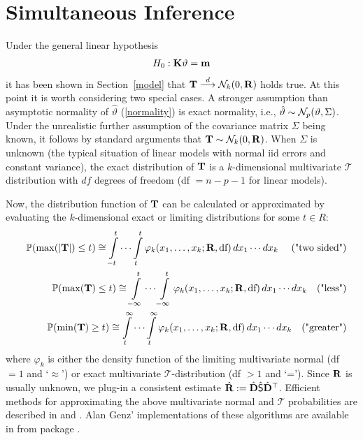 \documentclass[12pt]{article}
\begin{document}
\section{Simultaneous Inference} \label{siminf}

Under the general linear hypothesis \citep{Searle1971}
\begin{eqnarray*}
H_0: \mathbf{K} \vartheta = \mathbf{m}
\end{eqnarray*}
it has been shown in Section~\ref{model} that 
$\mathbf{T} \stackrel{d}{\longrightarrow} \mathcal{N}_k(0, \mathbf{R})$ holds true. At this point it is worth
considering two special cases. A stronger assumption than asymptotic normality
of $\hat{\vartheta}$ (\ref{normality}) is exact normality, i.e., 
$\hat{\vartheta} \sim \mathcal{N}_p(\vartheta, \Sigma)$. Under the unrealistic
further assumption of the covariance matrix $\Sigma$ being known, it
follows by standard arguments that $\mathbf{T} \sim \mathcal{N}_k(0, \mathbf{R})$. 
When $\Sigma$ is unknown (the typical situation of linear models
with normal iid errors and constant variance), the
exact distribution of $\mathbf{T}$ is a $k$-dimensional multivariate $\mathcal{T}$
distribution with $df$ degrees of freedom (df $ = n - p - 1$ for linear models).

Now, the distribution function of $\mathbf{T}$ can be calculated or approximated
by evaluating the $k$-dimensional exact or limiting distributions for some $t \in R$:
\begin{eqnarray*}
& & \mathbb{P}(\max(|\mathbf{T}|) \le t)  \cong  \int\limits_{-t}^t \cdots \int\limits_{t}^t 
\varphi_k(x_1, \dots, x_k; \mathbf{R}, \text{df}) \, dx_1 \cdots dx_k \quad \text{ ("two sided")}\\
& & \mathbb{P}(\max(\mathbf{T}) \le t)  \cong\int\limits_{-\infty}^t \cdots \int\limits_{-\infty}^t 
\varphi_k(x_1, \dots, x_k; \mathbf{R}, \text{df}) \, dx_1 \cdots dx_k \quad \text{("less")}\\
& & \mathbb{P}(\min(\mathbf{T}) \ge t) \cong  \int\limits_{t}^\infty \cdots \int\limits_{t}^\infty \varphi_k(x_1, \dots, x_k; \mathbf{R}, \text{df}) \, dx_1 \cdots dx_k \quad \text{("greater")}\\
\end{eqnarray*}
where $\varphi_k$ is either the density function of the limiting multivariate
normal (df $ = 1$ and `$\approx$') or exact multivariate $\mathcal{T}$-distribution (df $ > 1$
and `='). 
Since $\mathbf{R}$ is usually unknown, we plug-in a consistent estimate
$\hat{\mathbf{R}} := \hat{\mathbf{D}} \hat{\textsf{S}} \hat{\mathbf{D}}^\top$. Efficient methods
for approximating the above multivariate normal and $\mathcal{T}$ 
probabilities are described in \cite{Genz1992,GenzBretz1999,BretzGenzHothorn2001}
and \cite{GenzBretz2002}. Alan Genz' implementations of these algorithms
are available in \RR{} from package  
\citep{pkg:mvtnorm,Rnews:Hothorn+Bretz+Genz:2001}.
\end{document}
